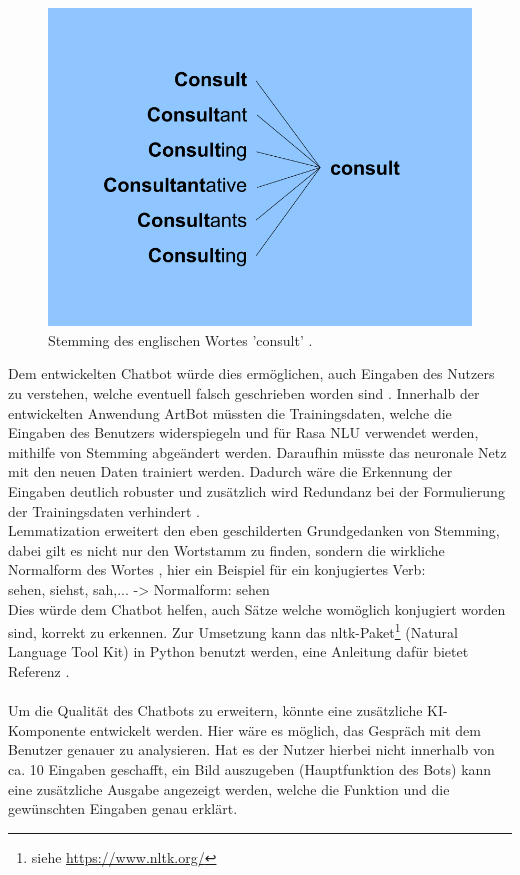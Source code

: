 \begin{figure}[htbp]
	\centerline{\includegraphics[width=0.5\linewidth]{figures/stemm.png}}
	\caption{Stemming des englischen Wortes 'consult' \cite{stemming2}.}
	\label{stemm}
\end{figure}
Dem entwickelten Chatbot würde dies ermöglichen, auch Eingaben des Nutzers zu verstehen, welche eventuell falsch geschrieben worden sind \cite{stemming}. Innerhalb der entwickelten Anwendung ArtBot müssten die Trainingsdaten, welche die Eingaben des Benutzers widerspiegeln und für Rasa NLU verwendet werden, mithilfe von Stemming abgeändert werden. Daraufhin müsste das neuronale Netz mit den neuen Daten trainiert werden. Dadurch wäre die Erkennung der Eingaben deutlich robuster und zusätzlich wird Redundanz bei der Formulierung der Trainingsdaten verhindert \cite{stemming}.\\
Lemmatization erweitert den eben geschilderten Grundgedanken von Stemming, dabei gilt es nicht nur den Wortstamm zu finden, sondern die wirkliche Normalform des Wortes \cite{stemming}, hier ein Beispiel für ein konjugiertes Verb:\\
sehen, siehst, sah,... -> Normalform: sehen\\
Dies würde dem Chatbot helfen, auch Sätze welche womöglich konjugiert worden sind, korrekt zu erkennen. Zur Umsetzung kann das nltk-Paket\footnote{siehe \href{https://www.nltk.org/}{https://www.nltk.org/}} (Natural Language Tool Kit) in Python benutzt werden, eine Anleitung dafür bietet Referenz \cite{stemming}.\\
\\
Um die Qualität des Chatbots zu erweitern, könnte eine zusätzliche KI-Komponente entwickelt werden. Hier wäre es möglich, das Gespräch mit dem Benutzer genauer zu analysieren. Hat es der Nutzer hierbei nicht innerhalb von ca. 10 Eingaben geschafft, ein Bild auszugeben (Hauptfunktion des Bots) kann eine zusätzliche Ausgabe angezeigt werden, welche die Funktion und die gewünschten Eingaben genau erklärt.\\
